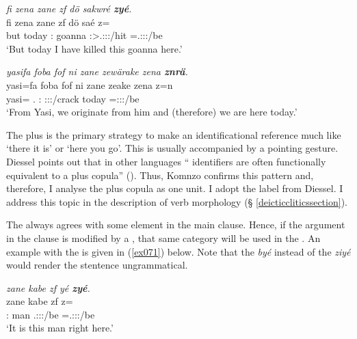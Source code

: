 \begin{exe}
	\ex \emph{fi zena zane zf dö sakwré \textbf{zyé}.}\\
	\gll fi zena zane zf dö saé z=\\
	but today \Dem:\Prox{} \Imm{} goanna \Fsg:\Sbj>\Tsg.\Masc:\Obj:\Rpst:\Pfv/hit \Prox=\Tsg.\Masc:\Sbj:\Nonpast:\Ipfv/be\\
	\trans `But today I have killed this goanna here.' 
	\label{ex068}
\end{exe}
\begin{exe}
	\ex \emph{yasifa foba fof ni zane zewärake zena \textbf{znrä}.}\\
	\gll yasi=fa foba fof ni zane zeake zena z=n\\
	yasi=\Abl{} \Dist.\Abl{} \Emph{} \Fnsg{} \Dem:\Prox{} \Fpl:\Sbj:\Pst:\Ipfv/crack today \Prox=\Fpl:\Sbj:\Nonpast:\Ipfv/be\\
	\trans `From Yasi, we originate from him and (therefore) we are here today.'\\ 
	\label{ex070}
\end{exe}

The   plus  is the primary strategy to make an identificational reference much like  `there it is' or `here you go'. This is usually accompanied by a pointing gesture. Diessel points out that in other languages `` identifiers are often functionally equivalent to a  plus copula'' (\citeyear[10]{Diessel:2009tg}). Thus, Komnzo confirms this pattern and, therefore, I analyse the   plus copula as one unit. I adopt the label   from Diessel. I address this topic in the description of verb morphology (\S{} \ref{deicticcliticssection}).%

The   always agrees with some element in the main clause. Hence, if the argument in the clause is modified by a  , that same  category will be used in the  . An example with the  is given in (\ref{ex071}) below. Note that the    \emph{byé} instead of the  \emph{ziyé} would render the stentence ungrammatical.

\begin{exe}
	\ex \emph{zane kabe zf yé \textbf{zyé}.}\\
	\gll zane kabe zf  z=\\
	\Dem:\Prox{} man \Imm{} \Tsg.\Masc:\Sbj:\Nonpast:\Ipfv/be \Prox=\Tsg.\Masc:\Sbj:\Nonpast:\Ipfv/be\\
	\trans `It is this man right here.' 
	\label{ex071}
\end{exe}

